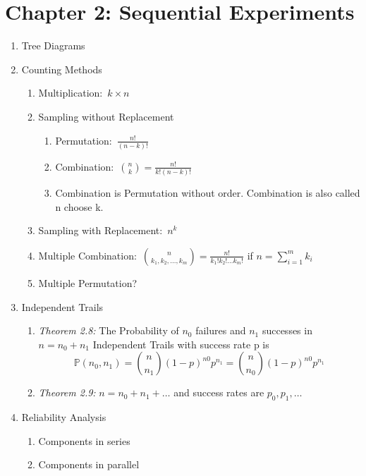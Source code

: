 \section*{Chapter 2: Sequential Experiments}
\begin{enumerate}
    \item Tree Diagrams
    \item Counting Methods
    \begin{enumerate}
        \item Multiplication:~$k\times n$
        \item Sampling without Replacement
        \begin{enumerate}
            \item Permutation:~$\frac{n!}{(n-k)!}$
            \item Combination:~$\binom{n}{k}=\frac{n!}{k!(n-k)!}$
            \item Combination is Permutation without order. Combination is also called n choose k.
        \end{enumerate}
        \item Sampling with Replacement:~$n^k$
        \item Multiple Combination:~$\binom{n}{k_1,k_2,\ldots,k_m}=\frac{n!}{k_1!k_2!\ldots k_m!}$ if $n=\sum_{i=1}^{m}k_i$
        \item Multiple Permutation?
    \end{enumerate}
    \item Independent Trails
    \begin{enumerate}
        \item \textit{Theorem 2.8:} The Probability of $n_0$ failures and $n_1$ successes in $n=n_0+n_1$ Independent Trails with success rate p is \[\mathbb{P}(n_0, n_1)=\binom{n}{n_1}(1-p)^{n0}p^{n_1}=\binom{n}{n_0}(1-p)^{n0}p^{n_1}\]
        \item \textit{Theorem 2.9:} $n=n_0+n_1+\ldots$ and success rates are $p_0, p_1,\ldots$
    \end{enumerate}
    \item Reliability Analysis
    \begin{enumerate}
        \item Components in series
        \item Components in parallel
    \end{enumerate}
\end{enumerate}